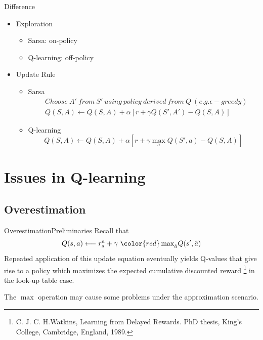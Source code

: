 \documentclass{beamer}
\newcommand{\red}[1]{{\color{red} #1}}
\newcommand{\blue}[1]{{\color{blue} #1}}
\newcommand{\ha}{\hat{a}}
\begin{document}
\begin{frame}{Difference}
  \begin{itemize}
  	\item Exploration
  		\begin{itemize}
  			\item Sarsa: on-policy
  			\item Q-learning: off-policy
  		\end{itemize}
  	\item Update Rule
	  	\begin{itemize}
	  		\item Sarsa
	  		\begin{equation}\nonumber
	  		\begin{aligned}
	  		& Choose~ A'~ from~ S'~ using~policy~derived~from~Q~(e.g. \epsilon-greedy) \\
	  		& Q(S,A) \leftarrow Q(S,A) + \alpha[r + \gamma Q(S', A') - Q(S,A)]
	  		\end{aligned}
	  		\end{equation}
	  		\item Q-learning
	  		\begin{equation}\nonumber
	  		Q(S,A) \leftarrow Q(S,A) + \alpha[r + \gamma \max_a Q(S', a) - Q(S,A)]
	  		\end{equation}
	  	\end{itemize}
  \end{itemize}
\end{frame}




\section{Issues in Q-learning}

\subsection{Overestimation}
\begin{frame}{Overestimation}{Preliminaries}
	Recall that
	\begin{equation}
		Q(s,a) \longleftarrow r^a_s + \gamma~\red{\max}_{\ha} Q(s', \ha)
	\end{equation}
	Repeated application of this update equation eventually yields Q-values that give rise to \blue{a policy which maximizes the expected cumulative discounted reward}
	\footnote{C. J. C. H.Watkins, Learning from Delayed Rewards. PhD thesis, King’s College, Cambridge, England, 1989.} in the look-up table case.
	
	The \red{$\max$} operation may cause some problems under the approximation scenario.
\end{frame}
\end{document}
